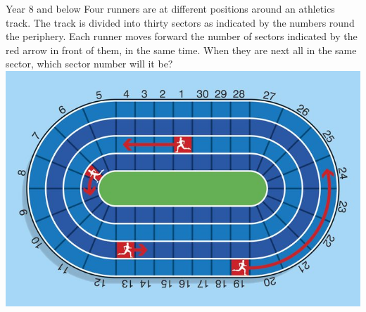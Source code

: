    \begin{MyInnerSplitBox}{Year 8 and below}
      Four runners are at different positions around an athletics track. The track is divided into thirty sectors as indicated by the numbers round the periphery. Each runner moves forward the number of sectors indicated by the red arrow in front of them, in the same time. When they are next all in the same sector, which sector number will it be?
      \tcblower
        \includegraphics[width=\linewidth]{images/WP-track.jpg}
    \end{MyInnerSplitBox}
